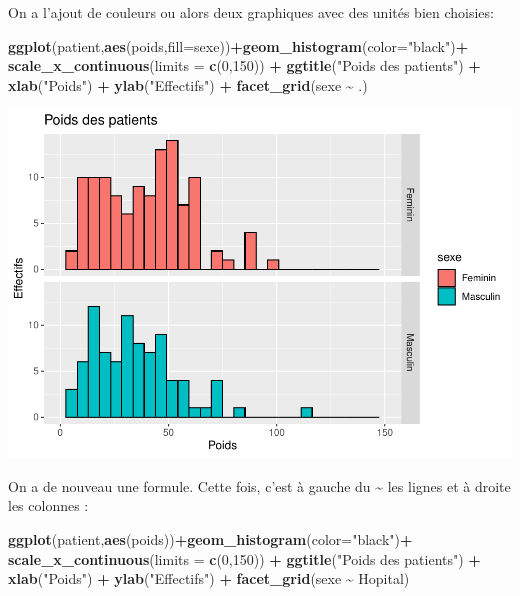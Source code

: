\documentclass[
]{book}
\newenvironment{Shaded}{\begin{snugshade}}{\end{snugshade}}
\newcommand{\AttributeTok}[1]{\textcolor[rgb]{0.13,0.29,0.53}{#1}}
\newcommand{\DecValTok}[1]{\textcolor[rgb]{0.00,0.00,0.81}{#1}}
\newcommand{\FunctionTok}[1]{\textcolor[rgb]{0.13,0.29,0.53}{\textbf{#1}}}
\newcommand{\NormalTok}[1]{#1}
\newcommand{\SpecialCharTok}[1]{\textcolor[rgb]{0.81,0.36,0.00}{\textbf{#1}}}
\newcommand{\StringTok}[1]{\textcolor[rgb]{0.31,0.60,0.02}{#1}}
\begin{document}
On a l'ajout de couleurs ou alors deux graphiques avec des unités bien choisies:

\begin{Shaded}
\begin{Highlighting}[]
\FunctionTok{ggplot}\NormalTok{(patient,}\FunctionTok{aes}\NormalTok{(poids,}\AttributeTok{fill=}\NormalTok{sexe))}\SpecialCharTok{+}\FunctionTok{geom\_histogram}\NormalTok{(}\AttributeTok{color=}\StringTok{"black"}\NormalTok{)}\SpecialCharTok{+}
  \FunctionTok{scale\_x\_continuous}\NormalTok{(}\AttributeTok{limits =} \FunctionTok{c}\NormalTok{(}\DecValTok{0}\NormalTok{,}\DecValTok{150}\NormalTok{)) }\SpecialCharTok{+} 
  \FunctionTok{ggtitle}\NormalTok{(}\StringTok{"Poids des patients"}\NormalTok{) }\SpecialCharTok{+} 
  \FunctionTok{xlab}\NormalTok{(}\StringTok{"Poids"}\NormalTok{) }\SpecialCharTok{+} 
  \FunctionTok{ylab}\NormalTok{(}\StringTok{"Effectifs"}\NormalTok{) }\SpecialCharTok{+}
  \FunctionTok{facet\_grid}\NormalTok{(sexe }\SpecialCharTok{\textasciitilde{}}\NormalTok{ .)}
\end{Highlighting}
\end{Shaded}

\includegraphics{_main_files/figure-latex/ggplot9-1.pdf}

On a de nouveau une formule. Cette fois, c'est à gauche du \textasciitilde{} les lignes et
à droite les colonnes :

\begin{Shaded}
\begin{Highlighting}[]
\FunctionTok{ggplot}\NormalTok{(patient,}\FunctionTok{aes}\NormalTok{(poids))}\SpecialCharTok{+}\FunctionTok{geom\_histogram}\NormalTok{(}\AttributeTok{color=}\StringTok{"black"}\NormalTok{)}\SpecialCharTok{+}
  \FunctionTok{scale\_x\_continuous}\NormalTok{(}\AttributeTok{limits =} \FunctionTok{c}\NormalTok{(}\DecValTok{0}\NormalTok{,}\DecValTok{150}\NormalTok{)) }\SpecialCharTok{+} 
  \FunctionTok{ggtitle}\NormalTok{(}\StringTok{"Poids des patients"}\NormalTok{) }\SpecialCharTok{+} 
  \FunctionTok{xlab}\NormalTok{(}\StringTok{"Poids"}\NormalTok{) }\SpecialCharTok{+} 
  \FunctionTok{ylab}\NormalTok{(}\StringTok{"Effectifs"}\NormalTok{) }\SpecialCharTok{+}
  \FunctionTok{facet\_grid}\NormalTok{(sexe }\SpecialCharTok{\textasciitilde{}}\NormalTok{ Hopital)}
\end{Highlighting}
\end{Shaded}
\end{document}
